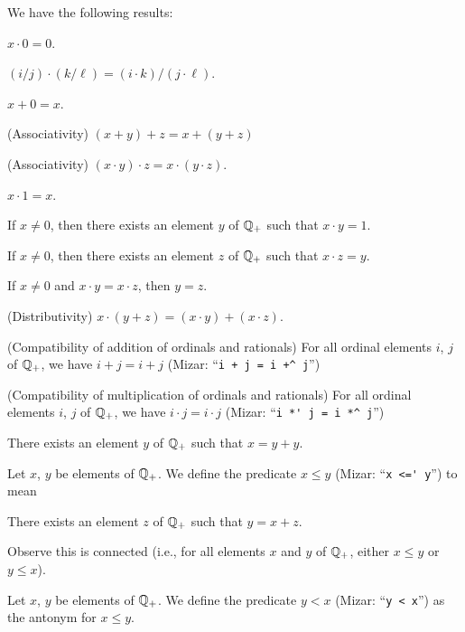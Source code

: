 \documentclass{article}
\begin{document}
We have the following results:
\begin{thm}
\item\label{arytm3:48} $x\cdot0=0$.
\item\label{arytm3:49} $(i/j)\cdot(k/\ell)=(i\cdot k)/(j\cdot\ell)$.
\item\label{arytm3:50} $x+0=x$.
\item\label{arytm3:51} (Associativity) $(x+y)+z=x+(y+z)$
\item\label{arytm3:52} (Associativity) $(x\cdot y)\cdot z=x\cdot(y\cdot z)$.
\item\label{arytm3:53} $x\cdot1=x$.
\item\label{arytm3:54} If $x\neq0$, then there exists an element $y$ of
  $\mathbb{Q}_{+}$ such that $x\cdot y=1$.
\item\label{arytm3:55} If $x\neq0$, then there exists an element $z$ of
  $\mathbb{Q}_{+}$ such that $x\cdot z=y$.
\item\label{arytm3:56} If $x\neq0$ and $x\cdot y=x\cdot z$,
  then $y=z$.
\item\label{arytm3:57} (Distributivity) $x\cdot(y+z)=(x\cdot y)+(x\cdot z)$.
\item\label{arytm3:58} (Compatibility of addition of ordinals and
  rationals) For all ordinal elements $i$, $j$ of $\mathbb{Q}_{+}$,
  we have $i+j=i+j$ (Mizar: ``\verb#i + j = i +^ j#'')
\item\label{arytm3:59} (Compatibility of multiplication of ordinals and
  rationals) For all ordinal elements $i$, $j$ of $\mathbb{Q}_{+}$,
  we have $i\cdot j=i\cdot j$ (Mizar: ``\verb#i *' j = i *^ j#'')
\item\label{arytm3:60} There exists an element $y$ of $\mathbb{Q}_{+}$ such
  that $x=y+y$.
\end{thm}

\begin{definition}
Let $x$, $y$ be elements of $\mathbb{Q}_{+}$.
We define the predicate $x\leq y$ (Mizar: ``\verb#x <=' y#'') to mean
\begin{defn}
\item There exists an element $z$ of $\mathbb{Q}_{+}$ such that $y=x+z$.
\end{defn}
Observe this is connected (i.e., for all elements $x$ and $y$ of
$\mathbb{Q}_{+}$, either $x\leq y$ or $y\leq x$).
\end{definition}

\begin{notation}
Let $x$, $y$ be elements of $\mathbb{Q}_{+}$.
We define the predicate $y < x$ (Mizar: ``\verb#y < x#'') as the antonym for $x\leq y$.
\end{notation}
\end{document}
